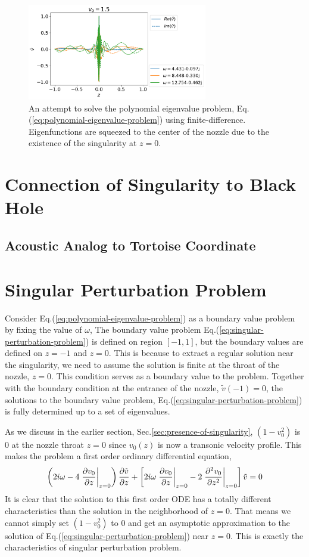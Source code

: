\begin{figure} [htbp]
	\centering
	\includegraphics[width=0.7\textwidth]{img/results-bad-accelerating-v}
	\caption{An attempt to solve the polynomial eigenvalue problem, Eq.(\ref{eq:polynomial-eigenvalue-problem}) using finite-difference. Eigenfunctions are squeezed to the center of the nozzle due to the existence of the singularity at $z=0$.}
	\label{fig:failure-of-spectral-method}
\end{figure}

\section{Connection of Singularity to Black Hole}
\subsection{Acoustic Analog to Tortoise Coordinate}

\section{Singular Perturbation Problem}
Consider Eq.(\ref{eq:polynomial-eigenvalue-problem}) as a boundary value problem by fixing the value of $\omega$,
The boundary value problem Eq.(\ref{eq:singular-perturbation-problem}) is defined on region $[-1,1]$, but the boundary values are defined on $z=-1$ and $z=0$. This is because to extract a regular solution near the singularity, we need to assume the solution is finite at the throat of the nozzle, $z=0$. This condition serves as a boundary value to the problem. Together with the boundary condition at the entrance of the nozzle, $\tilde{v}(-1) = 0$, the solutions to the boundary value problem, Eq.(\ref{eq:singular-perturbation-problem}) is fully determined up to a set of eigenvalues.

As we discuss in the earlier section, Sec.\ref{sec:presence-of-singularity}, $(1-v_0^2)$ is 0 at the nozzle throat $z=0$ since $v_0(z)$ is now a transonic velocity profile. This makes the problem a first order ordinary differential equation,
\[
	\left( 2i\omega - 4\eval{\pdv{v_0}{z}}_{z=0} \right)\pdv{\tilde{v}}{z}
	+ \left[2i\omega\eval{\pdv{v_0}{z}}_{z=0} - 2\eval{\pdv[2]{v_0}{z}}_{z=0} \right]\tilde{v}  = 0
\]
It is clear that the solution to this first order ODE has a totally different characteristics than the solution in the neighborhood of $z=0$. That means we cannot simply set $(1-v_0^2)$ to 0 and get an asymptotic approximation to the solution of Eq.(\ref{eq:singular-perturbation-problem}) near $z=0$. This is exactly the characteristics of singular perturbation problem.


